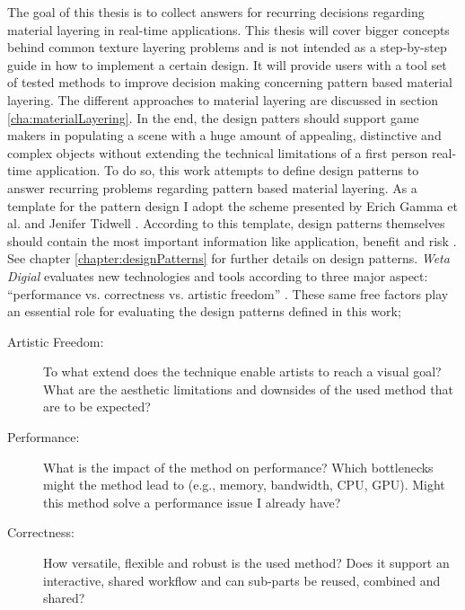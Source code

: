 The goal of this thesis is to collect answers for recurring decisions regarding material layering in real-time applications. This thesis will cover bigger concepts behind common texture layering problems and is not intended as a step-by-step guide in how to implement a certain design. It will provide users with a tool set of tested methods to improve decision making concerning pattern based material layering. The different approaches to material layering are discussed in section \ref{cha:materialLayering}. In the end, the design patters should support game makers in populating a scene with a huge amount of appealing, distinctive and complex objects without extending the technical limitations of a first person real-time application. To do so, this work attempts to define design patterns to answer recurring problems regarding pattern based material layering. As a template for the pattern design I adopt the scheme presented by Erich Gamma et al. \cite{gamma1995design} and Jenifer Tidwell \cite{tidwell2010designing}. According to this template, design patterns themselves should contain the most important information like application, benefit and risk \cite[p.\,3]{gamma1995design}. See chapter \ref{chapter:designPatterns} for further details on design patterns. \emph{Weta Digial} evaluates new technologies and tools according to three major aspect: ``performance vs. correctness vs. artistic freedom'' \cite{weidlich2011thinking}. These same free factors play an essential role for evaluating the design patterns defined in this work;  
\begin{description}
	\item[Artistic Freedom:] To what extend does the technique enable artists to reach a visual goal? What are the aesthetic limitations and downsides of the used method that are to be expected? 
	\item[Performance:] What is the impact of the method on performance? Which bottlenecks might the method lead to (e.g., memory, bandwidth, CPU, GPU). Might this method solve a performance issue I already have?   
	\item[Correctness:] How versatile, flexible and robust is the used method? Does it support an interactive, shared workflow and can sub-parts be reused, combined and shared? 
\end{description}
